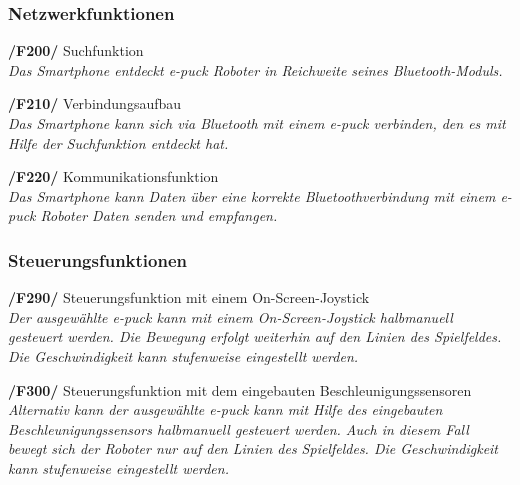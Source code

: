 \documentclass[10pt,a4paper]{article}
\begin{document}
			\subsubsection{Netzwerkfunktionen}
				\begin{list}{}{\leftmargin=1cm}
					\item[\textbf{/F200/}] Suchfunktion
						\\ \textsl{Das Smartphone entdeckt e-puck Roboter in Reichweite seines Bluetooth-Moduls.}
					\item[\textbf{/F210/}] Verbindungsaufbau
						\\ \textsl{Das Smartphone kann sich via Bluetooth mit einem e-puck verbinden, den es mit Hilfe
						der Suchfunktion entdeckt hat.}				
					\item[\textbf{/F220/}] Kommunikationsfunktion
						\\ \textsl{Das Smartphone kann Daten über eine korrekte Bluetoothverbindung mit einem e-puck Roboter Daten senden und
							empfangen.}
				\end{list}
			\subsubsection{Steuerungsfunktionen}		
				\begin{list}{}{\leftmargin=1cm}
					\item[\textbf{/F290/}] Steuerungsfunktion mit einem On-Screen-Joystick
						\\ \textsl{Der ausgewählte e-puck kann mit einem On-Screen-Joystick halbmanuell gesteuert werden. Die Bewegung
							erfolgt weiterhin auf den Linien des Spielfeldes. Die Geschwindigkeit kann stufenweise eingestellt werden.}	
					\item[\textbf{/F300/}] Steuerungsfunktion mit dem eingebauten Beschleunigungssensoren
						\\ \textsl{Alternativ kann der ausgewählte e-puck kann mit Hilfe des eingebauten Beschleunigungssensors halbmanuell
						gesteuert werden. Auch in diesem Fall bewegt sich der Roboter nur auf den Linien des Spielfeldes. Die Geschwindigkeit
						kann stufenweise eingestellt werden.}					
				\end{list}					
\end{document}
